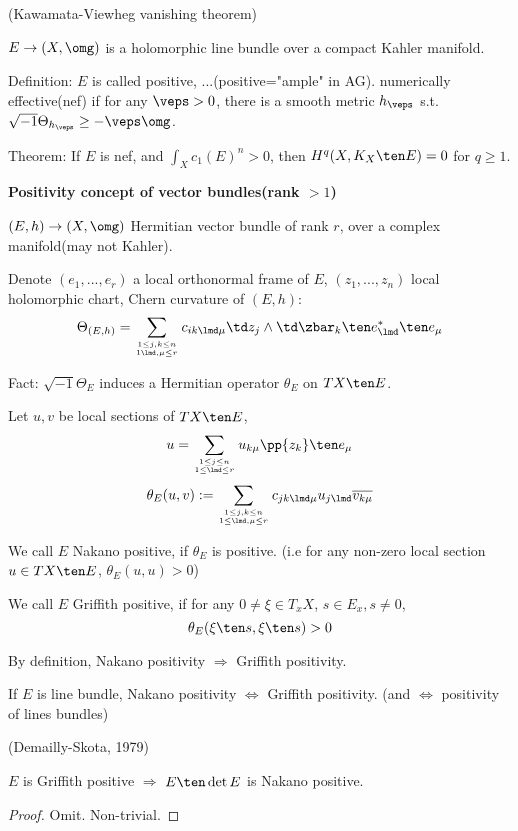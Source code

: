 \begin{rem}(Kawamata-Viewheg vanishing theorem)

$E\to (X,\omg)$ is a holomorphic line bundle over a compact Kahler manifold.

Definition: $E$ is called positive, ...(positive="ample" in AG).
numerically effective(nef) if for any $\veps>0$, there is a smooth metric $h_\veps$
s.t. $\sqrt{-1}\Theta_{h_\veps}\geq -\veps\omg$.

Theorem: If $E$ is nef, and $\int_X c_1(E)^n>0$, then 
$H^{q}(X,K_X\ten E)=0$ for $q\geq 1$.
\end{rem}

\textbf{Positivity concept of vector bundles(rank $>1$)}

$(E,h)\to (X,\omg)$ Hermitian vector bundle of rank $r$,
over a complex manifold(may not Kahler).

Denote $(e_1,...,e_r)$ a local orthonormal frame of $E$,
$(z_1,...,z_n)$ local holomorphic chart,
Chern curvature of $(E,h)$:
$$
  \Theta_{(E,h)}
= \sum_{1\leq j,k\leq n\atop 1\lmd,\mu\leq r} 
    c_{ik\lmd\mu}\td z_j\wedge\td\zbar_k\ten e_\lmd^*\ten e_\mu
$$ 

Fact: $\sqrt{-1}\Theta_E$ induces a Hermitian operator $\theta_E$
on $TX\ten E$.

Let $u,v$ be local sections of $TX\ten E$,
$$u=\sum_{1\leq j\leq n\atop1\leq\lmd\leq r}
u_{k\mu}\pp{z_k}\ten e_\mu
$$ 
$$
  \theta_{E}(u,v)
:=
  \sum_{1\leq j,k\leq n\atop 1\leq\lmd,\mu\leq r}
    c_{jk\lmd\mu} u_{j\lmd}\overline{v_{k\mu}}
$$

\begin{definition}
We call $E$ Nakano positive, if $\theta_E$ is positive.
(i.e for any non-zero local section $u\in TX\ten E$, $\theta_E(u,u)>0$)

We call $E$ Griffith positive, if for any 
$0\neq \xi\in T_xX$, $s\in E_x,s\neq 0$,
$$\theta_E(\xi\ten s,\xi\ten s)>0$$
\end{definition}

\begin{rem}
By definition, Nakano positivity $\Rightarrow$ Griffith positivity.

If $E$ is line bundle, 
Nakano positivity $\iff$ Griffith positivity.
(and $\iff$ positivity of lines bundles)
\end{rem}

\begin{thm}(Demailly-Skota, 1979)

$E$ is Griffith positive $\Rightarrow$ $E\ten \det E$ is Nakano positive.
\end{thm}
\begin{proof}
  Omit. Non-trivial.
\end{proof}

